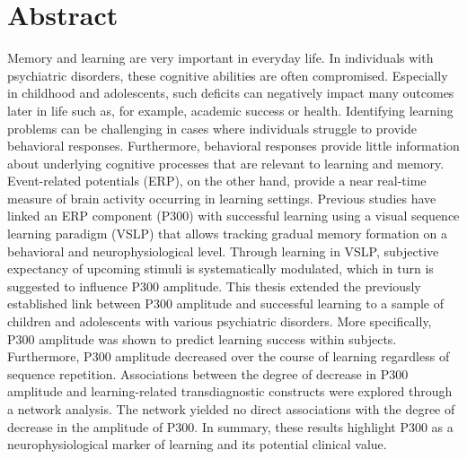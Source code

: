 \section*{Abstract}
\label{sec:abs}


Memory and learning are very important in everyday life. In individuals with psychiatric disorders, these cognitive abilities are often compromised. Especially in childhood and adolescents, such deficits can negatively impact many outcomes later in life such as, for example, academic success or health. Identifying learning problems can be challenging in cases where individuals struggle to provide behavioral responses. Furthermore, behavioral responses provide little information about underlying cognitive processes that are relevant to learning and memory. Event-related potentials (ERP), on the other hand, provide a near real-time measure of brain activity occurring in learning settings. Previous studies have linked an ERP component (P300) with successful learning using a visual sequence learning paradigm (VSLP) that allows tracking gradual memory formation on a behavioral and neurophysiological level. Through learning in VSLP, subjective expectancy of upcoming stimuli is systematically modulated, which in turn is suggested to influence P300 amplitude.
This thesis extended the previously established link between P300 amplitude and successful learning to a sample of children and adolescents with various psychiatric disorders. More specifically, P300 amplitude was shown to predict learning success within subjects. Furthermore, P300 amplitude decreased over the course of learning regardless of sequence repetition. Associations between the degree of decrease in P300 amplitude and learning-related transdiagnostic constructs were explored through a network analysis. The network yielded no direct associations with the degree of decrease in the amplitude of P300. 
In summary, these results highlight P300 as a neurophysiological marker of learning and its potential clinical value. 
\newpage

